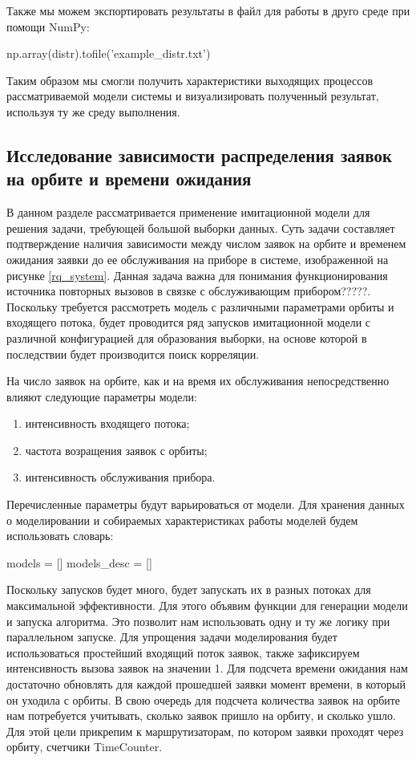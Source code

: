 Также мы можем экспортировать результаты в файл для работы в друго среде при помощи NumPy:
\begin{pyin} [rqtestchar]
np.array(distr).tofile('example_distr.txt')
\end{pyin}
Таким образом мы смогли получить характеристики выходящих процессов рассматриваемой модели системы и визуализировать полученный результат, используя ту же среду выполнения.

\subsection{Исследование зависимости распределения заявок на орбите и времени ожидания}
В данном разделе рассматривается применение имитационной модели для решения задачи, требующей большой выборки данных. Суть задачи составляет подтверждение наличия зависимости между числом заявок на орбите и временем ожидания заявки до ее обслуживания на приборе в системе, изображенной на рисунке \ref{rq_system}. Данная задача важна для понимания функционирования источника повторных вызовов в связке с обслуживающим прибором?????. Поскольку требуется рассмотреть модель с различными параметрами орбиты и входящего потока, будет проводится ряд запусков имитационной модели с различной конфигурацией для образования выборки, на основе которой в последствии будет производится поиск корреляции.

На число заявок на орбите, как и на время их обслуживания непосредственно влияют следующие параметры модели:
\begin{enumerate}
	\item интенсивность входящего потока;
	\item частота возращения заявок с орбиты;
	\item интенсивность обслуживания прибора.
\end{enumerate} 

Перечисленные параметры будут варьироваться от модели.
Для хранения данных о моделировании и собираемых характеристиках работы моделей будем использовать словарь:
\begin{pyin} 
models = []
models_desc = []
\end{pyin}

Поскольку запусков будет много, будет запускать их в разных потоках для максимальной эффективности. Для этого объявим функции для генерации модели и запуска алгоритма. Это позволит нам использовать одну и ту же логику при параллельном запуске. Для упрощения задачи моделирования будет использоваться простейший входящий поток заявок, также зафиксируем интенсивность вызова заявок на значении 1. Для подсчета времени ожидания нам достаточно обновлять для каждой прошедшей заявки момент времени, в который он уходила с орбиты. В свою очередь для подсчета количества заявок на орбите нам потребуется учитывать, сколько заявок пришло на орбиту, и сколько ушло. Для этой цели прикрепим к маршрутизаторам, по котором заявки проходят через орбиту, счетчики TimeCounter.

